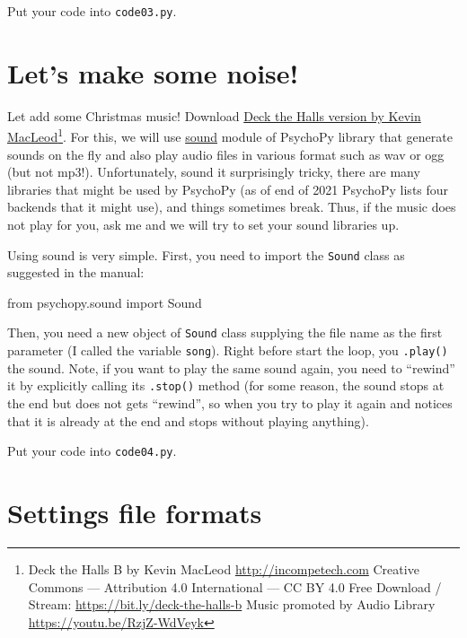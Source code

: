 \documentclass[
]{book}
\newenvironment{Shaded}{\begin{snugshade}}{\end{snugshade}}
\newcommand{\ImportTok}[1]{#1}
\newcommand{\NormalTok}[1]{#1}
\begin{document}
Put your code into \texttt{code03.py}.

\hypertarget{lets-make-some-noise}{%
\section{Let's make some noise!}\label{lets-make-some-noise}}

Let add some Christmas music! Download \href{material/Deck\%20the\%20Halls\%20B.ogg}{Deck the Halls version by Kevin MacLeod}\footnote{Deck the Halls B by Kevin MacLeod \url{http://incompetech.com}
  Creative Commons --- Attribution 4.0 International --- CC BY 4.0
  Free Download / Stream: \url{https://bit.ly/deck-the-halls-b}
  Music promoted by Audio Library \url{https://youtu.be/RzjZ-WdVeyk}}. For this, we will use \href{https://psychopy.org/api/sound.html}{sound} module of PsychoPy library that generate sounds on the fly and also play audio files in various format such as wav or ogg (but not mp3!). Unfortunately, sound it surprisingly tricky, there are many libraries that might be used by PsychoPy (as of end of 2021 PsychoPy lists four backends that it might use), and things sometimes break. Thus, if the music does not play for you, ask me and we will try to set your sound libraries up.

Using sound is very simple. First, you need to import the \texttt{Sound} class as suggested in the manual:

\begin{Shaded}
\begin{Highlighting}[]
\ImportTok{from}\NormalTok{ psychopy.sound }\ImportTok{import}\NormalTok{ Sound}
\end{Highlighting}
\end{Shaded}

Then, you need a new object of \texttt{Sound} class supplying the file name as the first parameter (I called the variable \texttt{song}). Right before start the loop, you \texttt{.play()} the sound. Note, if you want to play the same sound again, you need to ``rewind'' it by explicitly calling its \texttt{.stop()} method (for some reason, the sound stops at the end but does not gets ``rewind'', so when you try to play it again and notices that it is already at the end and stops without playing anything).

Put your code into \texttt{code04.py}.

\hypertarget{settings-files}{%
\section{Settings file formats}\label{settings-files}}
\end{document}
